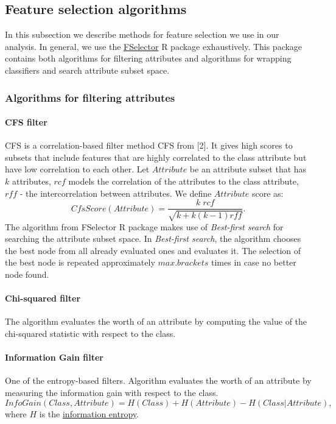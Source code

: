 \documentclass[10pt]{article}\usepackage[]{graphicx}\usepackage[]{color}
\begin{document}
\clearpage
\subsection{Feature selection algorithms}
In this subsection we describe methods for feature selection we use in our analysis. In general, we use the \href{http://cran.r-project.org/web/packages/FSelector/index.html}{FSelector} R package exhaustively. This package contains both algorithms for filtering attributes and algorithms for wrapping classifiers and search attribute subset space. 

\subsubsection{Algorithms for filtering attributes}

\paragraph{CFS filter}
CFS is a correlation-based filter method CFS from [2]. It gives high scores to subsets that include features that are highly correlated to the class attribute but have low correlation to each other. Let $Attribute$ be an attribute subset that has $k$ attributes, $rcf$ models the correlation of the attributes to the class attribute, $rff$ - the intercorrelation between attributes. We define $Attribute$ score as:
$$CfsScore(Attribute) =\frac{k\;  rcf}{ \sqrt{k+k(k-1) rff}}.$$
The algorithm from FSelector R package makes use of \textit{Best-first search} for searching the attribute subset space. In \textit{Best-first search}, the algorithm chooses the best node from all already evaluated ones and evaluates it. The selection of the best node is repeated approximately $max.brackets$ times in case no better node found.

\paragraph{Chi-squared filter}
The algorithm evaluates the worth of an attribute by computing the value of the chi-squared statistic with respect to the class.

\paragraph{Information Gain filter}
One of the entropy-based filters. Algorithm evaluates the worth of an attribute by measuring the information gain with respect to the class.
$$InfoGain(Class, Attribute)= H(Class) +  H(Attribute) - H(Class|Attribute),$$
where $H$ is the \href{http://en.wikipedia.org/wiki/Entropy_(information_theory)}{information entropy}. 
\end{document}
